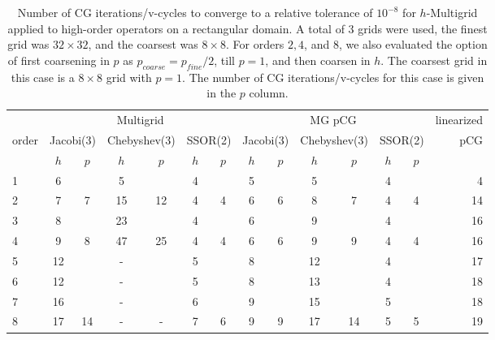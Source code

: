 \begin{table}
  \caption{\label{tab:box}  Number of CG iterations/v-cycles to converge to a relative tolerance of $10^{-8}$ for $h$-Multigrid applied to high-order operators on a rectangular domain. A total of 3 grids were used, the finest grid was $32\times 32$, and the coarsest was $8\times 8$. For orders $2,4$, and $8$, we also evaluated the option of first coarsening in $p$ as $p_{coarse} = p_{fine}/2$, till $p=1$, and then coarsen in $h$. The coarsest grid in this case is a $8\times 8$ grid with $p=1$. The number of CG iterations/v-cycles for this case is given in the $p$ column.}
		\centering
    \begin{tabular}{|l|c|c|c|c|c|c|c|c|c|c|c|c|r|} 
\hline
                     & \multicolumn{6}{c|}{Multigrid} & \multicolumn{6}{c|}{MG pCG} &          linearized \\
										 \cline{2-13}
			order &  \multicolumn{2}{c|}{\scriptsize  Jacobi(3)} &  \multicolumn{2}{c|}{\scriptsize Chebyshev(3)} & \multicolumn{2}{c|}{\scriptsize  SSOR(2)} & \multicolumn{2}{c|}{\scriptsize Jacobi(3)} &  \multicolumn{2}{c|}{\scriptsize Chebyshev(3)} & \multicolumn{2}{c|}{\scriptsize SSOR(2)} & pCG\\
\hline
 & $h$ & $p$ & $h$ & $p$& $h$ & $p$& $h$ & $p$& $h$ & $p$& $h$ & $p$& \\
 \cline{2-13}
    1 & 6 & & 5 & & 4 & & 5 & & 5 & & 4 & & 4 \\
		2 & 7 & 7 & 15 & 12 & 4 & 4 & 6 & 6 & 8 & 7 & 4 & 4 & 14\\
		3 & 8 & & 23 & & 4 & & 6 & & 9 & & 4 & & 16 \\
		4 & 9 & 8 & 47 & 25 & 4 & 4 & 6 & 6 & 9 & 9 & 4 & 4 & 16 \\
		5 & 12 & & - & & 5 & & 8 & & 12 & & 4 & & 17 \\
		6 & 12 & & - & & 5 & & 8 & & 13 & & 4 & & 18 \\
		7 & 16 & & - & & 6 & & 9 & & 15 & & 5 & & 18 \\
		8 & 17 & 14 & - & - & 7 & 6 & 9 & 9 & 17 & 14 & 5 & 5 & 19\\             
\hline
	  \end{tabular}
\end{table}

